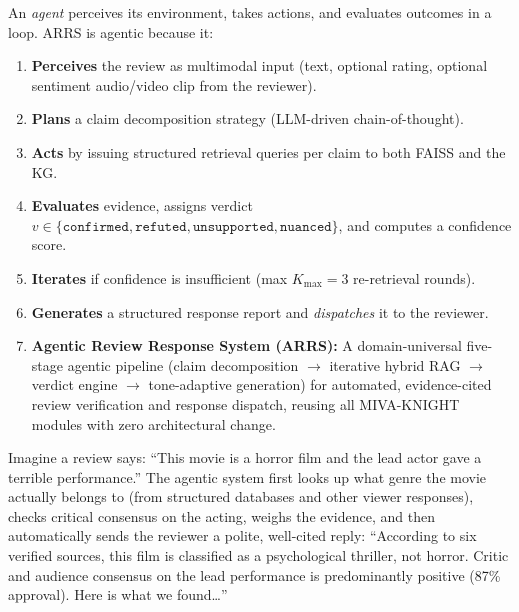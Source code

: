 \documentclass[12pt,a4paper]{article}
\theoremstyle{definition}
\theoremstyle{plain}
\theoremstyle{remark}
\begin{document}
\begin{tcolorbox}[keybox,title={What Makes It Agentic?}]
An \emph{agent} perceives its environment, takes actions, and evaluates outcomes 
in a loop. ARRS is agentic because it:
\begin{enumerate}[label=\textbf{A\arabic*.},nosep]
  \item \textbf{Perceives} the review as multimodal input (text, optional rating, 
        optional sentiment audio/video clip from the reviewer).
  \item \textbf{Plans} a claim decomposition strategy (LLM-driven chain-of-thought).
  \item \textbf{Acts} by issuing structured retrieval queries per claim to both 
        FAISS and the KG.
  \item \textbf{Evaluates} evidence, assigns verdict $v \in \{\mathtt{confirmed},
        \mathtt{refuted}, \mathtt{unsupported}, \mathtt{nuanced}\}$, and 
        computes a confidence score.
  \item \textbf{Iterates} if confidence is insufficient (max $K_{\max}=3$ 
        re-retrieval rounds).
  \item \textbf{Generates} a structured response report and \emph{dispatches} it 
        to the reviewer.
  \item \textbf{Agentic Review Response System (ARRS):} A domain-universal five-stage agentic pipeline (claim decomposition $\to$ iterative hybrid RAG $\to$ verdict engine $\to$ tone-adaptive generation) for automated, evidence-cited review verification and response dispatch, reusing all MIVA-KNIGHT modules with zero architectural change.
\end{enumerate}

\begin{tcolorbox}[laymanbox,title={In Plain Terms --- Agentic Review Response}]
Imagine a review says: ``This movie is a horror film and the lead actor gave a 
terrible performance.'' The agentic system first looks up what genre the movie 
actually belongs to (from structured databases and other viewer responses), checks 
critical consensus on the acting, weighs the evidence, and then automatically 
sends the reviewer a polite, well-cited reply: ``According to six verified sources, 
this film is classified as a psychological thriller, not horror. Critic and audience 
consensus on the lead performance is predominantly positive (87\% approval). 
Here is what we found\ldots''
\end{tcolorbox}
\end{tcolorbox}
\end{document}
